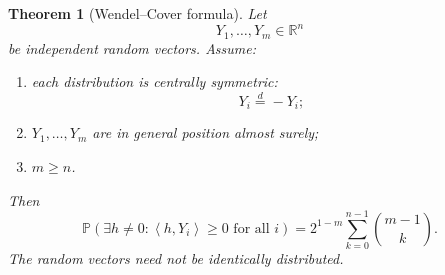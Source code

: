 \documentclass[11pt]{article}
\newtheorem{theorem}{Theorem}[section]
\newcommand{\R}{\mathbb{R}}
\newcommand{\ip}[2]{\left\langle #1,#2\right\rangle}
\newcommand{\Pp}{\mathbb{P}}
\newcommand{\1}{\mathbf{1}}
\begin{document}
\begin{theorem}[Wendel--Cover formula]
\label{thm:wendel-cover}
Let
\[
Y_1,\dots,Y_m\in\R^n
\]
be independent random vectors. Assume:

\begin{enumerate}[label=(\roman*)]
\item each distribution is centrally symmetric:
\[
Y_i\overset{d}{=}-Y_i;
\]

\item \(Y_1,\dots,Y_m\) are in general position almost surely;

\item \(m\ge n\).
\end{enumerate}

Then
\begin{equation}
\Pp\left(
\exists h\neq 0:
\ip{h}{Y_i}\ge 0
\text{ for all }i
\right)
=
2^{1-m}
\sum_{k=0}^{n-1}\binom{m-1}{k}.
\label{eq:wendel}
\end{equation}
The random vectors need not be identically distributed.
\end{theorem}
\end{document}
